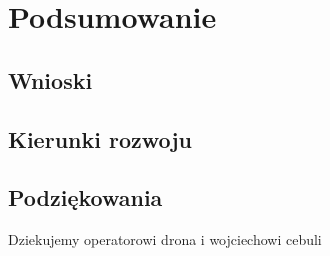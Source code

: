 \section{Podsumowanie}

\subsection{Wnioski}

\subsection{Kierunki rozwoju}

\subsection{Podziękowania}
Dziekujemy operatorowi drona i wojciechowi cebuli


